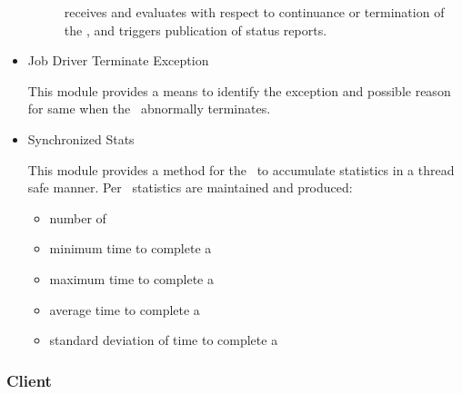 \begin{itemize}
\begin{description}
        receives and evaluates \ORMaps with respect to
        continuance or termination of the \varJobDriver,
        and triggers publication of \varJobDriver status reports.
        \end{description}
      \item{Job Driver Terminate Exception}
        \begin{description}
          This module provides a means to identify the exception and
          possible reason for same when the \varJobDriver~abnormally terminates.
        \end{description}
      \item{Synchronized Stats}
        \begin{description}
          This module provides a method for the \varJobDriver~to accumulate
          statistics in a thread safe manner. 
          Per \varWorkItem~statistics are maintained and produced:
        \end{description}
    
        \begin{itemize} 
            \item{number of \varWorkItems}
            \item{minimum time to complete a \varWorkItem}
            \item{maximum time to complete a \varWorkItem}
            \item{average time to complete a \varWorkItem}
            \item{standard deviation of time to complete a \varWorkItem}
        \end{itemize}
    
    \end{itemize}
    
    \subsubsection{Client}
    
